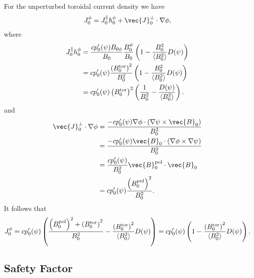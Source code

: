 For the unperturbed toroidal current density we have
\begin{gather}
  J_{0}^{\phi} = J_{0}^{\parallel} h_{0}^{\phi} + \vec{J}_{0}^{\perp} \cdot \grad \phi,
\end{gather}
where
\begin{align}
  J_{0}^{\parallel} h_{0}^{\phi} &= \frac{c p_{0}'(\psi) B_{0 \phi}}{B_{0}} \frac{B_{0}^{\phi}}{B_{0}} \left( 1 - \frac{B_{0}^{2}}{\left\langle B_{0}^{2} \right\rangle} D(\psi) \right) \nonumber \\
  &= c p_{0}'(\psi) \frac{\left( B_{0}^{\tor} \right)^{2}}{B_0^2} \left( 1 - \frac{B_{0}^{2}}{\left\langle B_{0}^{2} \right\rangle} D(\psi) \right) \nonumber \\
  &= c p_{0}'(\psi) \left( B_{0}^{\tor} \right)^{2} \left( \frac{1}{B_{0}^{2}} - \frac{D(\psi)}{\left\langle B_{0}^{2} \right\rangle} \right).
\end{align}
and
\begin{align}
  \vec{J}_{0}^{\perp} \cdot \grad \phi &= \frac{-c p_{0}'(\psi) \grad \phi \cdot (\grad \psi \times \vec{B}_{0})}{B_{0}^{2}} \nonumber \\
  &= \frac{-c p_{0}'(\psi) \vec{B}_{0} \cdot (\grad \phi \times \grad \psi)}{B_{0}^{2}} \\
  &= \frac{c p_{0}'(\psi)}{B_{0}^{2}} \vec{B}_{0}^{\pol} \cdot \vec{B}_{0} \nonumber \\
  &= c p_{0}'(\psi) \frac{\left( B_{0}^{\pol} \right)^{2}}{B_{0}^{2}}.
\end{align}
It follows that
\begin{gather}
  J_{0}^{\phi} = c p_{0}'(\psi) \left( \frac{\left( B_{0}^{\pol} \right)^{2} + \left( B_{0}^{\tor} \right)^{2}}{B_{0}^{2}} - \frac{\left( B_{0}^{\tor} \right)^{2}}{\left\langle B_{0}^{2} \right\rangle} D(\psi)\right) = c p_{0}'(\psi) \left( 1 - \frac{\left( B_{0}^{\tor} \right)^{2}}{\left\langle B_{0}^{2} \right\rangle} D(\psi)\right).
\end{gather}

\subsection{Safety Factor}
\label{sec:safety_factor}

